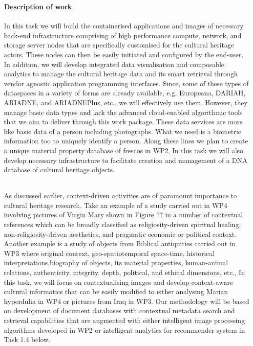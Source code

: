 \textbf{Description of work}\\
\\
In this task we will build the containerised applications and images of necessary back-end infrastructure comprising of high performance compute, network, and storage server nodes that are specifically customised for the cultural heritage actors. These nodes can then be easily initiated and configured by the end-user. In addition, we will develop integrated data visualisation and composable analytics to manage the cultural heritage data and its smart retrieval through vendor agnostic application programming interfaces. Since, some of these types of dataspaces in a variety of forms are already available, e.g. Europeana, DARIAH, ARIADNE, and ARIADNEPlus, etc., we will effectively use them. However, they manage basic data types and lack the advanced cloud-enabled algorithmic tools that we aim to deliver through this work package. These data services are more like basic data of a person including photographs. What we need is a biometric information too to uniquely identify a person. Along these lines we plan to create a unique material property database of frescos in WP2. In this task we will also develop necessary infrastructure to facilitate creation and management of a DNA database of cultural heritage objects.

\\
As discussed earlier, context-driven activities are of paramount importance to cultural heritage research. Take an example of a study carried out in WP4 involving pictures of Virgin Mary shown in Figure ?? in a number of contextual references which can be broadly classified as religiosity-driven spiritual healing, non-religiosity-driven aesthetics, and pragmatic economic or political context. Another example is a study of objects from Biblical antiquities carried out in WP3 where original context, geo-spatiotemporal space-time, historical interpretations,biography of objects, its material properties, human-animal relations, authenticity, integrity, depth, political, and ethical dimensions, etc., In this task, we will focus on contextualising images and develop context-aware cultural informatics that can be easily modified to either analysing Marian hyperdulia in WP4 or pictures from Iraq in WP3. Our methodology will be based on development of document databases with contextual metadata search and retrieval capabilities that are augmented with either intelligent image processing algorithms developed in WP2 or intelligent analytics for recommender system in Task 1.4 below.

